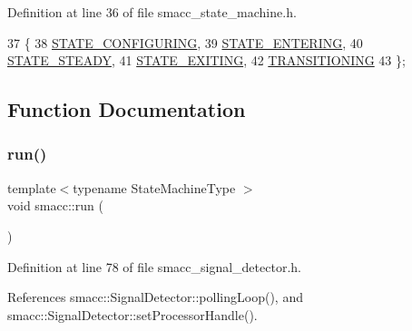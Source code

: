 Definition at line 36 of file smacc\+\_\+state\+\_\+machine.\+h.


\begin{DoxyCode}
37 \{
38     \hyperlink{namespacesmacc_a0889aff43c93fe5285109819d2898144a32406d3560b9f36b3e6e3b84454e1be5}{STATE\_CONFIGURING},
39     \hyperlink{namespacesmacc_a0889aff43c93fe5285109819d2898144aef27ae3e54b805b81e1efacea3c02575}{STATE\_ENTERING},
40     \hyperlink{namespacesmacc_a0889aff43c93fe5285109819d2898144aaefffb251a9a48e0e3274e9475d22749}{STATE\_STEADY},
41     \hyperlink{namespacesmacc_a0889aff43c93fe5285109819d2898144a22bd5bb7935dd66f181d92efc273951e}{STATE\_EXITING},
42     \hyperlink{namespacesmacc_a0889aff43c93fe5285109819d2898144a5e174e130ee1847f37541ba5786207a3}{TRANSITIONING}
43 \};
\end{DoxyCode}


\subsection{Function Documentation}
\mbox{\label{namespacesmacc_a47ac3b8d2968b1ba4152afd64ab66bd0}} 
\subsubsection{\texorpdfstring{run()}{run()}}
{\footnotesize\ttfamily template$<$typename State\+Machine\+Type $>$ \\
void smacc\+::run (\begin{DoxyParamCaption}{ }\end{DoxyParamCaption})}



Definition at line 78 of file smacc\+\_\+signal\+\_\+detector.\+h.



References smacc\+::\+Signal\+Detector\+::polling\+Loop(), and smacc\+::\+Signal\+Detector\+::set\+Processor\+Handle().



